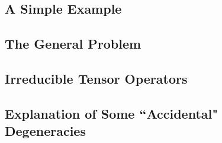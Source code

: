\subsection{A Simple Example}

\subsection{The General Problem}

\subsection{Irreducible Tensor Operators}

\subsection{Explanation of Some ``Accidental" Degeneracies}
